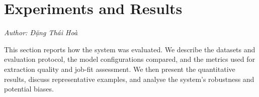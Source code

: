 \section{Experiments and Results}
\noindent\textit{Author: Đặng Thái Hoà}


This section reports how the system was evaluated. We describe the datasets
and evaluation protocol, the model configurations compared, and the metrics
used for extraction quality and job-fit assessment. We then present the
quantitative results, discuss representative examples, and analyse the
system's robustness and potential biases.
